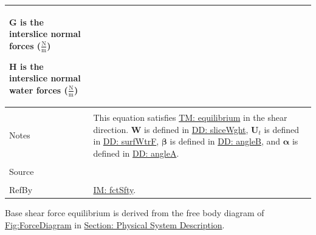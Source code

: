 \documentclass[12pt]{article}
\begin{document}
\begin{minipage}{\textwidth}
\begin{tabular}{p{} p{}}
\begin{symbDescription}
              \item{$\mathbf{G}$ is the interslice normal forces ($\frac{\text{N}}{\text{m}}$)}
              \item{$\mathbf{H}$ is the interslice normal water forces ($\frac{\text{N}}{\text{m}}$)}
              \end{symbDescription}
\\ \midrule \\
Notes & This equation satisfies \hyperref[TM:equilibrium]{TM: equilibrium} in the shear direction. $\mathbf{W}$ is defined in \hyperref[DD:sliceWght]{DD: sliceWght}, ${\mathbf{U}_{t}}$ is defined in \hyperref[DD:surfWtrF]{DD: surfWtrF}, $\mathbf{β}$ is defined in \hyperref[DD:angleB]{DD: angleB}, and $\mathbf{α}$ is defined in \hyperref[DD:angleA]{DD: angleA}.
\\ \midrule \\
Source & \cite{chen2005}
\\ \midrule \\
RefBy & \hyperref[IM:fctSfty]{IM: fctSfty}.
\\ \bottomrule \end{tabular}
\end{minipage}
Base shear force equilibrium is derived from the free body diagram of \hyperref[Figure:ForceDiagram]{Fig:ForceDiagram} in \hyperref[Sec:PhysSyst]{Section: Physical System Description}.
\par~
\end{document}
